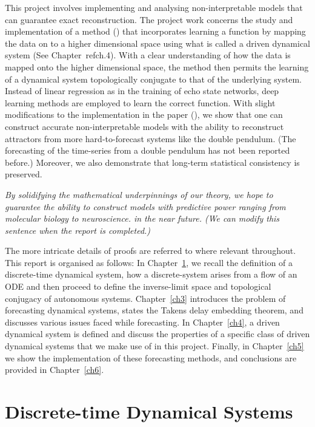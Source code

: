 \documentclass[a4paper,12pt,twoside]{report}
\begin{document}
This project involves implementing and analysing non-interpretable models that can guarantee exact reconstruction. 
The project work concerns the study and implementation of a method (\cite{manjunath2021universal}) that incorporates learning a function by mapping the data on to a higher dimensional space using what is called a driven dynamical system (See Chapter~ref{ch.4}). With a clear understanding of how the data is mapped onto the higher dimensional space, the method then permits the learning of a dynamical system topologically conjugate to that of the underlying system. Instead of linear regression as in the training of echo state networks, deep learning methods are employed to learn the correct function. With slight modifications to the implementation in the paper (\cite{manjunath2021universal}), we show that one can construct accurate non-interpretable models with the ability to reconstruct attractors from more hard-to-forecast systems like the double pendulum. (The forecasting of the time-series from a double pendulum has not been reported before.) Moreover, we also demonstrate that long-term statistical consistency is preserved.

\emph{By solidifying the mathematical underpinnings of our theory, we hope to guarantee the ability to construct models with predictive power ranging from molecular biology to neuroscience. in the near future. (We can modify this sentence when the report is completed.)}

The more intricate details of proofs are referred to where relevant throughout. This report is organised as follows: 
\newline In Chapter~\ref{ch2}, we recall the definition of a discrete-time dynamical system, how a discrete-system arises from a flow of an ODE and then proceed to define the inverse-limit space and topological conjugacy of autonomous systems. 
\newline Chapter~\ref{ch3} introduces the problem of forecasting dynamical systems, states the Takens delay embedding theorem, and discusses various issues faced while forecasting. 
\newline In Chapter~\ref{ch4}, a driven dynamical system is defined and discuss the properties of a specific class of driven dynamical systems that we make use of in this project.
\newline Finally, in Chapter~\ref{ch5} we show the implementation of these forecasting methods, and conclusions are provided in Chapter~\ref{ch6}.


\chapter{Discrete-time Dynamical Systems}\label{ch2}
\end{document}
